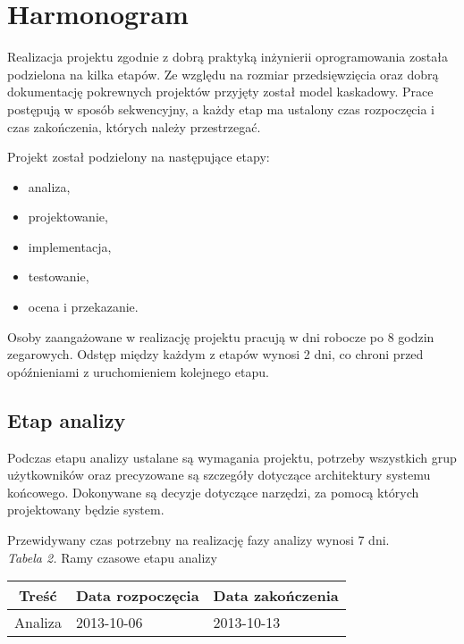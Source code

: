 \documentclass 	[11pt, a4paper, leqno]	{article}					%
\begin{document}
\section{Harmonogram}
\noindent
Realizacja projektu zgodnie z dobrą praktyką inżynierii oprogramowania została podzielona na kilka etapów. Ze względu na rozmiar przedsięwzięcia oraz dobrą dokumentację pokrewnych projektów przyjęty został model kaskadowy. Prace postępują w sposób sekwencyjny, a każdy etap ma ustalony czas rozpoczęcia i czas zakończenia, których należy przestrzegać.

Projekt został podzielony na następujące etapy:
\begin{itemize}
	\item analiza,
	\item projektowanie,
	\item implementacja,
	\item testowanie,
	\item ocena i przekazanie.
\end{itemize}

Osoby zaangażowane w realizację projektu pracują w dni robocze po 8 godzin zegarowych. Odstęp między każdym z etapów wynosi 2 dni, co chroni przed opóźnieniami z uruchomieniem kolejnego etapu.

\subsection{Etap analizy}
\noindent
Podczas etapu analizy ustalane są wymagania projektu, potrzeby wszystkich grup użytkowników oraz precyzowane są szczegóły dotyczące architektury systemu końcowego. Dokonywane są decyzje dotyczące narzędzi, za pomocą których projektowany będzie system. 

Przewidywany czas potrzebny na realizację fazy analizy wynosi 7 dni. \\


\textit{Tabela 2.} Ramy czasowe etapu analizy

\begin{center}
	\begin{tabular}{| l | l | l |}
		\hline
		\multicolumn{1}{|c|}{Treść} & 
		\multicolumn{1}{|c|}{Data rozpoczęcia} & 
		\multicolumn{1}{|c|}{Data zakończenia} \\ \hline \hline
		Analiza & 2013-10-06 & 2013-10-13 \\ \hline
	\end{tabular}
\end{center}
\end{document}
